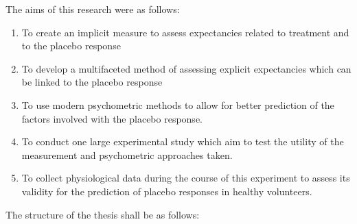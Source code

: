 The aims of this research were as follows:
\begin{enumerate}
\item To create an implicit measure to assess expectancies related to treatment and to the placebo response

\item To develop a multifaceted method of assessing explicit expectancies which can be linked to the placebo response


\item To use modern psychometric methods to allow for better prediction of the factors involved with the placebo response. 

\item To conduct one large experimental study which aim to test the utility of the measurement and psychometric approaches taken. 


\item To collect physiological data during the course of this experiment to assess its validity for the prediction of placebo responses in healthy volunteers.
\end{enumerate}

The structure of the thesis shall be as follows:

